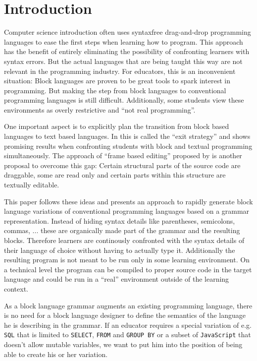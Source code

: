 \documentclass[sigconf,natbib=false,review=true,anonymous]{acmart}
\begin{document}
\section{Introduction}

Computer science introduction often uses syntaxfree drag-and-drop programming languages to ease the first steps when learning how to program. This approach has the benefit of entirely eliminating the possibility of confronting learners with syntax errors. But the actual languages that are being taught this way are not relevant in the programming industry. For educators, this is an inconvenient situation: Block languages are proven to be great tools to spark interest in programming. But making the step from block languages to conventional programming languages is still difficult. Additionally, some students view these environments as overly restrictive and \enquote{not real programming}\cite{braune_learning_2020}.

One important aspect is to explicitly plan the transition from block based languages to text based languages. In \cite{fraser_ten_2015} this is called the \enquote{exit strategy} and \cite{alrubaye_comparison_2019} shows promising results when confronting students with block and textual programming simultaneously. The approach of \enquote{frame based editing} proposed by \cite{kolling_frame-based_2015} is another proposal to overcome this gap: Certain structural parts of the source code are draggable, some are read only and certain parts within this structure are textually editable.

This paper follows these ideas and presents an approach to rapidly generate block language variations of conventional programming languages based on a grammar representation. Instead of hiding syntax details like parentheses, semicolons, commas, ... these are organically made part of the grammar and the resulting blocks. Therefore learners are continously confronted with the syntax details of their language of choice without having to actually type it. Additionally the resulting program is not meant to be run only in some learning environment. On a technical level the program can be compiled to proper source code in the target language and could be run in a \enquote{real} environment outside of the learning context.

As a block language grammar augments an existing programming language, there is no need for a block language designer to define the semantics of the language he is describing in the grammar. If an educator requires a special variation of e.g. \texttt{SQL} that is limited to \texttt{SELECT}, \texttt{FROM} and \texttt{GROUP BY} or a subset of \texttt{JavaScript} that doesn't allow mutable variables, we want to put him into the position of being able to create his or her variation.
\end{document}
